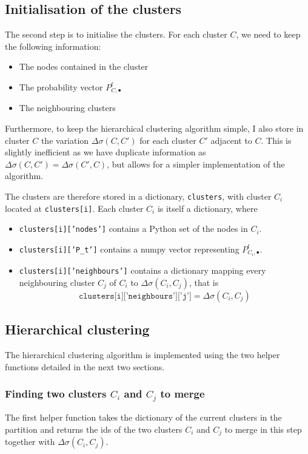 \documentclass[12pt]{article}
\theoremstyle{definition}
\begin{document}
\subsection{Initialisation of the clusters}
The second step is to initialise the clusters. For each cluster $C$, we need to keep the following information:
\begin{itemize}
	\item The nodes contained in the cluster
	\item The probability vector $P_{C,\bullet}^t$
	\item The neighbouring clusters
\end{itemize}
Furthermore, to keep the hierarchical clustering algorithm simple, I also store in cluster $C$ the variation $\Delta\sigma(C,C')$ for each cluster $C'$ adjacent to $C$. This is slightly inefficient as we have duplicate information as $\Delta\sigma(C,C') = \Delta\sigma(C',C)$, but allows for a simpler implementation of the algorithm.

\bigskip

The clusters are therefore stored in a dictionary, \texttt{clusters}, with cluster $C_i$ located at \texttt{clusters[i]}. Each cluster $C_i$ is itself a dictionary, where
\begin{itemize}
	\item \texttt{clusters[i]['nodes']} contains a Python set of the nodes in $C_i$.
	\item \texttt{clusters[i]['P\_t']} contains a numpy vector representing $P_{C_i,\bullet}^t$.
	\item \texttt{clusters[i]['neighbours']} contains a dictionary mapping every neighbouring cluster $C_j$ of $C_i$ to $\Delta\sigma(C_i,C_j)$, that is 
	\[\texttt{clusters[i]['neighbours']['j']} = \Delta\sigma(C_i,C_j)\]
\end{itemize}

\subsection{Hierarchical clustering}
The hierarchical clustering algorithm is implemented using the two helper functions detailed in the next two sections. 
\subsubsection{Finding two clusters $C_i$ and $C_j$ to merge}
The first helper function takes the dictionary of the current clusters in the partition and returns the ids of the two clusters $C_i$ and $C_j$ to merge in this step together with $\Delta\sigma(C_i,C_j)$. 
\end{document}
